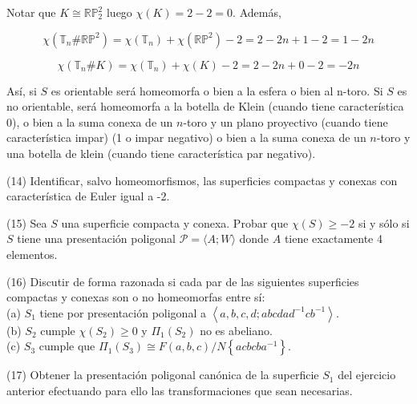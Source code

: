 \documentclass[
  a4paper,
  spanish,
  12pt,
]{scrartcl}
\begin{document}
\begin{sol}
Notar que $K \cong \mathbb{RP}_2^2$ luego $\chi(K) = 2-2 = 0$.
Además, 

$$
\chi(\mathbb{T}_n \# \mathbb{RP}^2) = \chi(\mathbb{T}_n) + \chi(\mathbb{RP}^2) - 2 = 2-2n + 1 -2= 1-2n
$$

$$
\chi(\mathbb{T}_n  \# K) =  \chi(\mathbb{T}_n) + \chi(K) -2  = 2-2n + 0 - 2 = -2n
$$

Así, si $S$ es orientable será homeomorfa o bien a la esfera o bien al n-toro.
Si $S$ es no orientable, será homeomorfa a la botella de Klein (cuando tiene característica 0),
o bien a la suma conexa de un $n$-toro y un plano proyectivo (cuando tiene característica impar) (1 o impar negativo)
o bien a la suma conexa de un $n$-toro y una botella de klein (cuando tiene característica par negativo).

\end{sol}

\begin{ejer}
(14) Identificar, salvo homeomorfismos, las superficies compactas y conexas con característica de Euler igual a -2.\\
\end{ejer}

\begin{ejer}
(15) Sea $S$ una superficie compacta y conexa. Probar que $\chi(S) \geq-2$ si y sólo si $S$ tiene una presentación poligonal $\mathscr{P}=\langle A ; W\rangle$ donde $A$ tiene exactamente 4 elementos.\\
\end{ejer}

\begin{ejer}
(16) Discutir de forma razonada si cada par de las siguientes superficies compactas y conexas son o no homeomorfas entre sí:\\
(a) $S_{1}$ tiene por presentación poligonal a $\left\langle a, b, c, d ; a b c d a d^{-1} c b^{-1}\right\rangle$.\\
(b) $S_{2}$ cumple $\chi\left(S_{2}\right) \geq 0$ y $\Pi_{1}\left(S_{2}\right)$ no es abeliano.\\
(c) $S_{3}$ cumple que $\Pi_{1}\left(S_{3}\right) \cong F(a, b, c) / N\left\{a c b c b a^{-1}\right\}$.\\
\end{ejer}

\begin{ejer}
(17) Obtener la presentación poligonal canónica de la superficie $S_{1}$ del ejercicio anterior efectuando para ello las transformaciones que sean necesarias.\\
\end{ejer}
\end{document}
